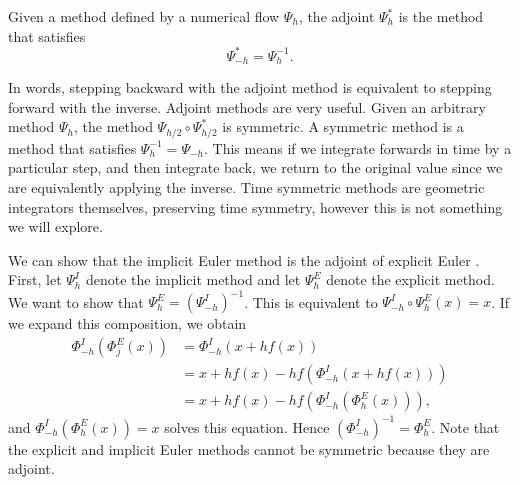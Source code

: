 \begin{definition}
	Given a method defined by a numerical flow $\Psi_h$,
	the adjoint $\Psi^*_h$ is the method that satisfies
	\begin{equation*}
		\Psi^*_{-h} = \Psi^{-1}_h.
	\end{equation*}
\end{definition}

In words, stepping backward with the adjoint method is equivalent to stepping forward with the inverse.
Adjoint methods are very useful. Given an arbitrary method $\Psi_h$,
the method $\Psi_{h/2} \circ \Psi_{h/2}^*$ is symmetric.
A symmetric method is a method that satisfies $\Psi_h^{-1} = \Psi_{-h}$.
This means if we integrate forwards in time by a particular step, and then integrate back,
we return to the original value since we are equivalently applying the inverse.
Time symmetric methods are geometric integrators themselves, preserving time symmetry,
however this is not something we will explore. %

We can show that the implicit Euler method is the adjoint of explicit Euler \cite{sanz2018hamiltonian}.
First, let $\Psi_h^I$ denote the implicit method and let $\Psi_h^E$ denote the explicit method.
We want to show that $\Psi_h^E = (\Psi_{-h}^I)^{-1}$.
This is equivalent to $\Psi_{-h}^I \circ \Psi_h^E (x) = x$.
If we expand this composition, we obtain
\begin{align*}
	\Phi_{-h}^I \left( \Phi_j^E  (x) \right) &= \Phi_{-h}^I \left( x + h f(x) \right) \\
	&= x + h f(x) - h f\left( \Phi_{-h}^I \left( x + h f(x) \right) \right) \\
	&= x + h f(x) - h f\left( \Phi_{-h}^I \left( \Phi_h^E (x) \right) \right),
\end{align*}
and $\Phi_{-h}^I (\Phi_h^E (x)) = x$ solves this equation. Hence $(\Phi_{-h}^I)^{-1} = \Phi_h^E$.
Note that the explicit and implicit Euler methods cannot be symmetric because they are adjoint.

